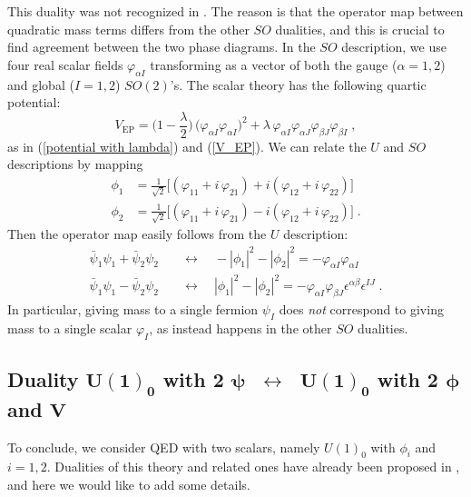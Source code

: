 \documentclass[a4paper, 12pt]{article}
\newcommand{\matht}[1]{\ensuremath{\boldsymbol{#1}}}
\numberwithin{equation}{section}
\newcommand{\be}{\begin{equation}} \newcommand{\ee}{\end{equation}}
\newcommand{\bea}{\begin{equation} \begin{aligned}} \newcommand{\eea}{\end{aligned} \end{equation}}
\begin{document}
This duality was not recognized in \cite{Aharony:2016jvv}. The reason is that the operator map between quadratic mass terms differs from the other $SO$ dualities, and this is crucial to find agreement between the two phase diagrams. In the $SO$ description, we use four real scalar fields $\varphi_{\alpha I}$ transforming as a vector of both the gauge ($\alpha =1,2$) and global ($I=1,2$) $SO(2)$'s. The scalar theory has the following quartic potential:
\be
V_\text{EP} = \Big( 1 - \frac\lambda2\Big) \, \big( \varphi_{\alpha I} \varphi_{\alpha I} \big)^2 + \lambda \, \varphi_{\alpha I} \varphi_{\alpha J} \varphi_{\beta J} \varphi_{\beta I} \;,
\ee
as in (\ref{potential with lambda}) and (\ref{V_EP}). We can relate the $U$ and $SO$ descriptions by mapping
\bea
\phi_1 &= \frac1{\sqrt2} \big[ (\varphi_{11} + i \, \varphi_{21}) + i (\varphi_{12} + i \, \varphi_{22}) \big] \\
\phi_2 &= \frac1{\sqrt2} \big[ (\varphi_{11} + i \, \varphi_{21}) - i (\varphi_{12} + i \, \varphi_{22}) \big] \;.
\eea
Then the operator map easily follows from the $U$ description:
\bea
\bar\psi_1\psi_1 + \bar\psi_2\psi_2 &\quad\longleftrightarrow\quad - |\phi_1|^2 - |\phi_2|^2 = - \varphi_{\alpha I} \varphi_{\alpha I} \\
\bar\psi_1\psi_1 - \bar\psi_2\psi_2 &\quad\longleftrightarrow\quad |\phi_1|^2 - |\phi_2|^2 = - \varphi_{\alpha I} \varphi_{\beta J} \epsilon^{\alpha\beta} \epsilon^{IJ} \;.
\eea
In particular, giving mass to a single fermion $\psi_I$ does \emph{not} correspond to giving mass to a single scalar $\varphi_I$, as instead happens in the other $SO$ dualities.











\subsection[Duality $U(1)_0$ with 2 $\psi$ $\;\longleftrightarrow\;$ $U(1)_0$ with 2 $\phi$ and $V$]{Duality \matht{U(1)_0} with 2 \matht{\psi} \matht{\;\longleftrightarrow\;} \matht{U(1)_0} with 2 \matht{\phi} and \matht{V}}
\label{sec: scalar QED}

To conclude, we consider QED with two scalars, namely $U(1)_0$ with $\phi_i$ and $i=1,2$. Dualities of this theory and related ones have already been proposed in \cite{Motrunich:2003fz, Xu:2015lxa, Karch:2016sxi, Hsin:2016blu, Benini:2017dus, Wang:2017txt}, and here we would like to add some details.
\end{document}
